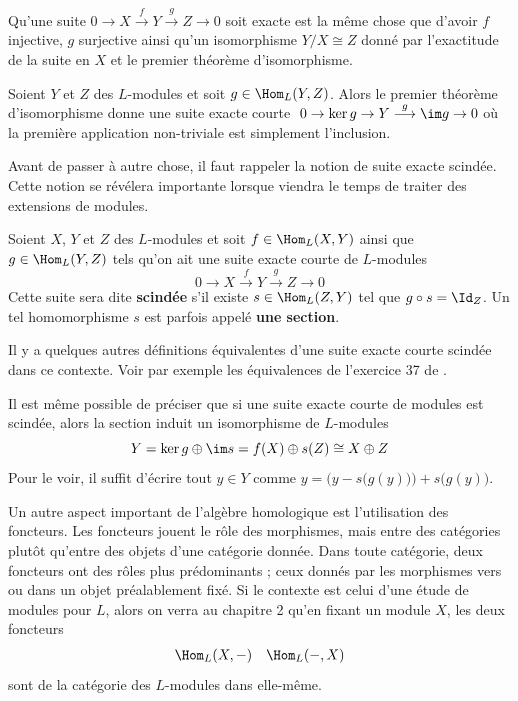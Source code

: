 \begin{Rem} Qu'une suite $0 \longrightarrow X \stackrel{f}{\longrightarrow} Y \stackrel{g}{\longrightarrow} Z \longrightarrow 0$ soit exacte est la même chose que d'avoir $f$ injective, $g$ surjective ainsi qu'un isomorphisme $Y/X \cong Z$ donné par l'exactitude de la suite en $X$ et le premier théorème d'isomorphisme.
\end{Rem}

\begin{Rem} Soient $Y$ et $Z$ des $L$-modules et soit $g \in \Hom_L(Y,Z)$. Alors le premier théorème d'isomorphisme donne une suite exacte courte $\; 0 \rightarrow \ker g \rightarrow Y \stackrel{g}{\longrightarrow} \im g \rightarrow 0$ où la première application non-triviale est simplement l'inclusion.
\end{Rem}

Avant de passer à autre chose, il faut rappeler la notion de suite exacte scindée. Cette notion se révélera importante lorsque viendra le temps de traiter des extensions de modules.

\begin{Def} Soient $X$, $Y$ et $Z$ des $L$-modules et soit $f \in \Hom_L(X,Y)$ ainsi que $g \in \Hom_L(Y,Z)$ tels qu'on ait une suite exacte courte de $L$-modules
$$ 0 \longrightarrow X \stackrel{f}{\longrightarrow} Y \stackrel{g}{\longrightarrow} Z \longrightarrow 0 $$
Cette suite sera dite \textbf{scindée} s'il existe $s \in \Hom_L(Z,Y)$ tel que $g \circ s = \Id_Z$. Un tel homomorphisme $s$ est parfois appelé \textbf{une section}.
\end{Def}

\begin{Rem} \label{suitescindee} Il y a quelques autres définitions équivalentes d'une suite exacte courte scindée dans ce contexte. Voir par exemple les équivalences de l'exercice 37 de \cite{FDnoncom}. 

Il est même possible de préciser que si une suite exacte courte de modules est scindée, alors la section induit un isomorphisme de $L$-modules
$$ Y = \ker g \oplus \im s = f(X) \oplus s(Z) \cong X \oplus Z $$
Pour le voir, il suffit d'écrire tout $y \in Y$ comme $y = \Big(y-s\big(g(y)\big)\Big) + s\big(g(y)\big)$. 
\end{Rem}

Un autre aspect important de l'algèbre homologique est l'utilisation des foncteurs. Les foncteurs jouent le rôle des morphismes, mais entre des catégories plutôt qu'entre des objets d'une catégorie donnée. Dans toute catégorie, deux foncteurs ont des rôles plus prédominants ; ceux donnés par les morphismes vers ou dans un objet préalablement fixé. Si le contexte est celui d'une étude de modules pour $L$, alors on verra au chapitre 2 qu'en fixant un module $X$, les deux foncteurs
\begin{align*}
\Hom_L(X,-) && \Hom_L(-,X)
\end{align*}
sont de la catégorie des $L$-modules dans elle-même.  

